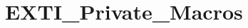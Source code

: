 \hypertarget{group___e_x_t_i___private___macros}{\section{E\-X\-T\-I\-\_\-\-Private\-\_\-\-Macros}
\label{group___e_x_t_i___private___macros}
}
